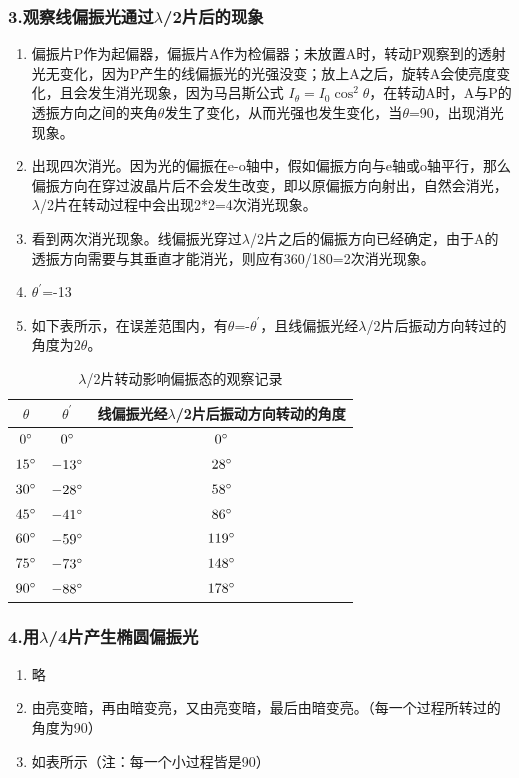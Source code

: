\documentclass[12pt,a4paper,UTF8]{ctexart}
\begin{document}
	\subsubsection*{3.观察线偏振光通过$\lambda$/2片后的现象}
	\begin{enumerate}[(1)]
			\item 偏振片P作为起偏器，偏振片A作为检偏器；未放置A时，转动P观察到的透射光无变化，因为P产生的线偏振光的光强没变；放上A之后，旋转A会使亮度变化，且会发生消光现象，因为马吕斯公式 $ I_{\theta}=I_{0}\cos^{2}\theta $，在转动A时，A与P的透振方向之间的夹角$\theta$发生了变化，从而光强也发生变化，当$\theta$=90\degree，出现消光现象。
			\item 出现四次消光。因为光的偏振在e-o轴中，假如偏振方向与e轴或o轴平行，那么偏振方向在穿过波晶片后不会发生改变，即以原偏振方向射出，自然会消光，$\lambda$/2片在转动过程中会出现2*2=4次消光现象。
			\item 看到两次消光现象。线偏振光穿过$\lambda$/2片之后的偏振方向已经确定，由于A的透振方向需要与其垂直才能消光，则应有360\degree /180\degree =2次消光现象。
			\item $\theta^{\prime}$=-13\degree 
			\item 如下表所示，在误差范围内，有$\theta$=-$\theta^{\prime}$，且线偏振光经$\lambda$/2片后振动方向转过的角度为2$\theta$。
	\end{enumerate}
	
	\begin{table}[htbp]
	  \centering
	\caption{$\lambda$/2片转动影响偏振态的观察记录}
	    \begin{tabular}{c|c|c}
			\hline
	    	\textbf{$\theta$} & \textbf{$\theta^{\prime}$} & \textbf{线偏振光经$\lambda$/2片后振动方向转动的角度}\\
			\hline
			$0\degree$ & $0\degree$ & $0\degree$ \\
			$15\degree$ & $-13\degree$ & $28\degree$ \\
			$30\degree$ & $-28\degree$ & $58\degree$ \\
			$45\degree$ & $-41\degree$ & $86\degree$ \\
			$60\degree$ & $-59\degree$ & $119\degree$ \\
			$75\degree$ & $-73\degree$ & $148\degree$ \\
			$90\degree$ & $-88\degree$ & $178\degree$ \\
			\hline
	    \end{tabular}
	\end{table}
	\subsubsection*{4.用$\lambda$/4片产生椭圆偏振光}
	\begin{enumerate}[(1)]
		\item 略
		\item 由亮变暗，再由暗变亮，又由亮变暗，最后由暗变亮。（每一个过程所转过的角度为90\degree）
		\item 如表所示（注：每一个小过程皆是90\degree）
	\end{enumerate}
	
\end{document}

